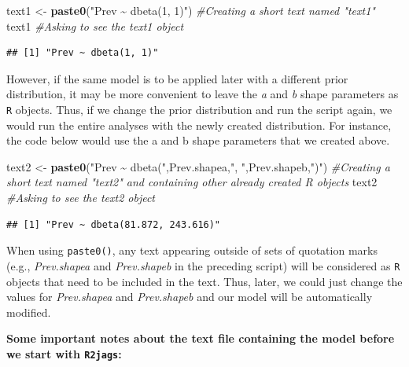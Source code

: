 \documentclass[
]{book}
\newenvironment{Shaded}{\begin{snugshade}}{\end{snugshade}}
\newcommand{\CommentTok}[1]{\textcolor[rgb]{0.56,0.35,0.01}{\textit{#1}}}
\newcommand{\FunctionTok}[1]{\textcolor[rgb]{0.13,0.29,0.53}{\textbf{#1}}}
\newcommand{\NormalTok}[1]{#1}
\newcommand{\OtherTok}[1]{\textcolor[rgb]{0.56,0.35,0.01}{#1}}
\newcommand{\StringTok}[1]{\textcolor[rgb]{0.31,0.60,0.02}{#1}}
\begin{document}
\begin{Shaded}
\begin{Highlighting}[]
\NormalTok{text1 }\OtherTok{\textless{}{-}} \FunctionTok{paste0}\NormalTok{(}\StringTok{"Prev \textasciitilde{} dbeta(1, 1)"}\NormalTok{)       }\CommentTok{\#Creating a short text named "text1"}
\NormalTok{text1                                       }\CommentTok{\#Asking to see the text1 object}
\end{Highlighting}
\end{Shaded}

\begin{verbatim}
## [1] "Prev ~ dbeta(1, 1)"
\end{verbatim}

However, if the same model is to be applied later with a different prior distribution, it may be more convenient to leave the \emph{a} and \emph{b} shape parameters as \texttt{R} objects. Thus, if we change the prior distribution and run the script again, we would run the entire analyses with the newly created distribution. For instance, the code below would use the a and b shape parameters that we created above.

\begin{Shaded}
\begin{Highlighting}[]
\NormalTok{text2 }\OtherTok{\textless{}{-}} \FunctionTok{paste0}\NormalTok{(}\StringTok{"Prev \textasciitilde{} dbeta("}\NormalTok{,Prev.shapea,}\StringTok{", "}\NormalTok{,Prev.shapeb,}\StringTok{")"}\NormalTok{)            }\CommentTok{\#Creating a short text named "text2" and containing other already created R objects}
\NormalTok{text2                                                                        }\CommentTok{\#Asking to see the text2 object}
\end{Highlighting}
\end{Shaded}

\begin{verbatim}
## [1] "Prev ~ dbeta(81.872, 243.616)"
\end{verbatim}

When using \texttt{paste0()}, any text appearing outside of sets of quotation marks (e.g., \emph{Prev.shapea} and \emph{Prev.shapeb} in the preceding script) will be considered as \texttt{R} objects that need to be included in the text. Thus, later, we could just change the values for \emph{Prev.shapea} and \emph{Prev.shapeb} and our model will be automatically modified.

\textbf{Some important notes about the text file containing the model before we start with \texttt{R2jags}:}
\end{document}
